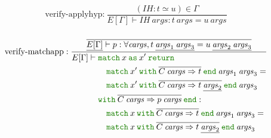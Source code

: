 \documentclass[a4paper,fleqn]{article}
\newcommand{\kwmatch}{\mbox{\color{mygreen}\ttfamily match}}
\newcommand{\kwas}{\mbox{\color{mygreen}\ttfamily as}}
\newcommand{\kwreturn}{\mbox{\color{mygreen}\ttfamily return}}
\newcommand{\kwwith}{\mbox{\color{mygreen}\ttfamily with}}
\newcommand{\kwend}{\mbox{\color{mygreen}\ttfamily end}}
\newcommand{\breakrule}{\\[0.5em]}
\newcommand{\rep}[1]{\overline{#1}}
\begin{document}
\begin{gather*}
  \text{verify-applyhyp:}~
    \dfrac{
      (\mathit{IH} : t \simeq u) \in \Gamma
    }{
      E[\Gamma] \vdash \mathit{IH}\ \mathit{args} : t\ \mathit{args} = u\ \mathit{args}
    } \breakrule
\end{gather*}

\begin{gather*}
  \text{verify-matchapp}:
    \dfrac{
      \rep{\underline{E[\Gamma]} \vdash p : \forall \mathit{cargs}, t\:\underline{\mathit{args}_1\:\mathit{args}_3} = u\:\underline{\mathit{args}_2\:\mathit{args}_3}}
    }{
      E[\Gamma] \vdash
        \begin{aligned}[t]
          & \kwmatch\:x\:\kwas\:x'\:\kwreturn \\
          & \quad
              \begin{aligned}
                & \kwmatch\:x'\:\kwwith\:\rep{C\:\mathit{cargs} \Rightarrow t}\:\kwend\:\mathit{args}_1\:\mathit{args}_3 = \\
                & \kwmatch\:x'\:\kwwith\:\rep{C\:\mathit{cargs} \Rightarrow t\:\underline{\mathit{args}_2}}\:\kwend\:\mathit{args}_3
              \end{aligned} \\
          & \kwwith\:\rep{C\:\mathit{cargs} \Rightarrow p\:\mathit{cargs}}\:\kwend : \\
          & \quad
              \begin{aligned}
                & \kwmatch\:x\:\kwwith\:\rep{C\:\mathit{cargs} \Rightarrow t}\:\kwend\:\mathit{args}_1\:\mathit{args}_3 = \\
                & \kwmatch\:x\:\kwwith\:\rep{C\:\mathit{cargs} \Rightarrow t\:\underline{\mathit{args}_2}}\:\kwend\:\mathit{args}_3
              \end{aligned}
        \end{aligned}
    } \breakrule
\end{gather*}
\end{document}
